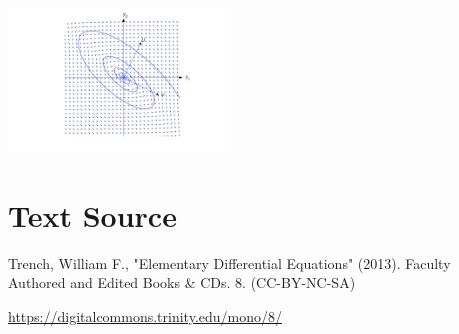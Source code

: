 \documentclass{ximera}
\begin{document}
\begin{image}
 \includegraphics[height=1.5in]{fig100606.jpg} 
\end{image}


\section*{Text Source}
Trench, William F., "Elementary Differential Equations" (2013). Faculty Authored and Edited Books \& CDs. 8. (CC-BY-NC-SA)

\href{https://digitalcommons.trinity.edu/mono/8/}{https://digitalcommons.trinity.edu/mono/8/}
\end{document}

